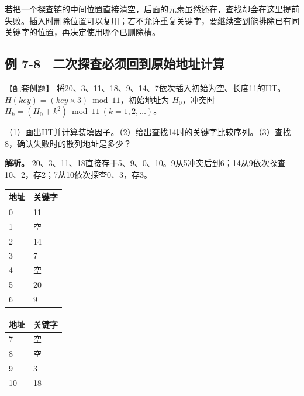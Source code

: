 若把一个探查链的中间位置直接清空，后面的元素虽然还在，查找却会在这里提前失败。插入时删除位置可以复用；若不允许重复关键字，要继续查到能排除已有同关键字的位置，再决定使用哪个已删除槽。

\subsection{例 7-8　二次探查必须回到原始地址计算}\label{DS07-ex8}

\begin{example}[配套案例]

【配套例题】 将20、3、11、18、9、14、7依次插入初始为空、长度11的HT。\(H(key)=(key\times3)\bmod11\)，初始地址为 \(H_0\)，冲突时 \(H_k=(H_0+k^2)\bmod11\ (k=1,2,\ldots)\)。

（1）画出HT并计算装填因子。（2）给出查找14时的关键字比较序列。（3）查找8，确认失败时的散列地址是多少？

\end{example}

\textbf{解析。} 20、3、11、18直接存于5、9、0、10。9从5冲突后到6；14从9依次探查10、2，存2；7从10依次探查0、3，存3。

\begin{wideblock}

\par\medskip\noindent\begin{minipage}{\linewidth}\fontsize{9.3}{12}\selectfont\begin{tabularx}{\linewidth}{@{}YY@{}}
\toprule\noalign{}
地址 & 关键字 \\
\midrule\noalign{}


0 & 11 \\
1 & 空 \\
2 & 14 \\
3 & 7 \\
4 & 空 \\
5 & 20 \\
6 & 9 \\
\bottomrule\end{tabularx}
\end{minipage}\par\medskip

\par\medskip\noindent\begin{minipage}{\linewidth}\fontsize{9.3}{12}\selectfont\begin{tabularx}{\linewidth}{@{}YY@{}}
\toprule\noalign{}
地址 & 关键字 \\
\midrule\noalign{}


7 & 空 \\
8 & 空 \\
9 & 3 \\
10 & 18 \\
\bottomrule\end{tabularx}
\end{minipage}\par\medskip

\end{wideblock}

